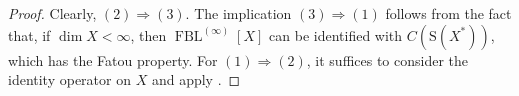 \documentclass{amsart}
\theoremstyle{plain}
\theoremstyle{definition}
\numberwithin{equation}{section}
\newcommand{\N}{\mathbb{N}}
\newcommand{\vr}{\varepsilon}
\newcommand{\sphere}{\textrm{S}}
\DeclareMathOperator{\FBL}{FBL}
\begin{document}
\begin{proof}
Clearly, $(2) \Rightarrow (3)$. The implication $(3) \Rightarrow (1)$ follows from the fact that, if $\dim X < \infty$, then $\FBL^{(\infty)}[X]$ can be identified with $C(\sphere(X^*))$, which has the Fatou property. For $(1) \Rightarrow (2)$, it suffices to consider the identity operator on $X$ and apply .
\end{proof}

\end{document}
